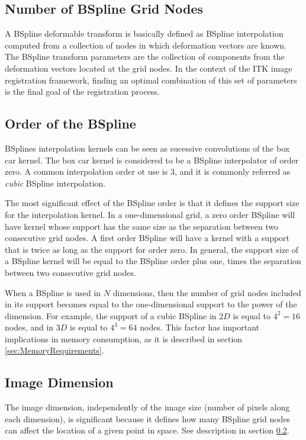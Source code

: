 \documentclass{InsightArticle}
\begin{document}
\subsection{Number of BSpline Grid Nodes}

A BSpline deformable transform is basically defined as BSpline interpolation
computed from a collection of nodes in which deformation vectors are known.
The BSpline transform parameters are the collection of components from the
deformation vectors located at the grid nodes. In the context of the ITK image
registration framework, finding an optimal combination of this set of
parameters is the final goal of the registration process.

\subsection{Order of the BSpline}
\label{sec:BSplineOrder}

BSplines interpolation kernels can be seen as sucessive convolutions of the box
car kernel. The box car kernel is considered to be a BSpline interpolator of
order zero. A common interpolation order ot use is $3$, and it is commonly
referred as \emph{cubic} BSpline interpolation.

The most significant effect of the BSpline order is that it defines the support
size for the interpolation kernel. In a one-dimensional grid, a zero order
BSpline will have kernel whose support has the same size as the separation
between two consecutive grid nodes. A first order BSpline will have a kernel
with a support that is twice as long as the support for order zero. In general,
the support size of a BSpline kernel will be equal to the BSpline order plus
one, times the separation between two consecutive grid nodes.

When a BSpline is used in $N$ dimensions, then the number of grid nodes
included in its support becomes equal to the one-dimensional support to the
power of the dimension. For example, the support of a cubic BSpline in $2D$ is
equal to $4^2=16$ nodes, and in $3D$ is equal to $4^3=64$ nodes. This factor
has important implications in memory consumption, as it is described in section
\ref{sec:MemoryRequirements}.

\subsection{Image Dimension}

The image dimension, independently of the image size (number of pixels along
each dimension), is significant because it defines how many BSpline grid nodes
can affect the location of a given point in space. See description in section
\ref{sec:BSplineOrder}.
\end{document}
